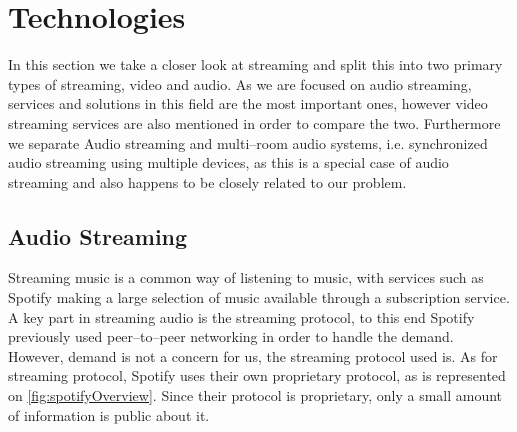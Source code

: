 






\section{Technologies}\label{sec:sota_technologies}
In this section we take a closer look at streaming and split this into two primary types of streaming, video and audio.
As we are focused on audio streaming, services and solutions in this field are the most important ones, however video streaming services are also mentioned in order to compare the two.
Furthermore we separate Audio streaming and multi--room audio systems, i.e. synchronized audio streaming using multiple devices, as this is a special case of audio streaming and also happens to be closely related to our problem.

\subsection{Audio Streaming}
Streaming music is a common way of listening to music, with services such as Spotify making a large selection of music available through a subscription service.
A key part in streaming audio is the streaming protocol, to this end Spotify previously used peer--to--peer networking in order to handle the demand.\cite{spotify1}
However, demand is not a concern for us, the streaming protocol used is.
As for streaming protocol, Spotify uses their own proprietary protocol, as is represented on \cref{fig:spotifyOverview}.\cite{spotifySlides} %
Since their protocol is proprietary, only a small amount of information is public about it.

